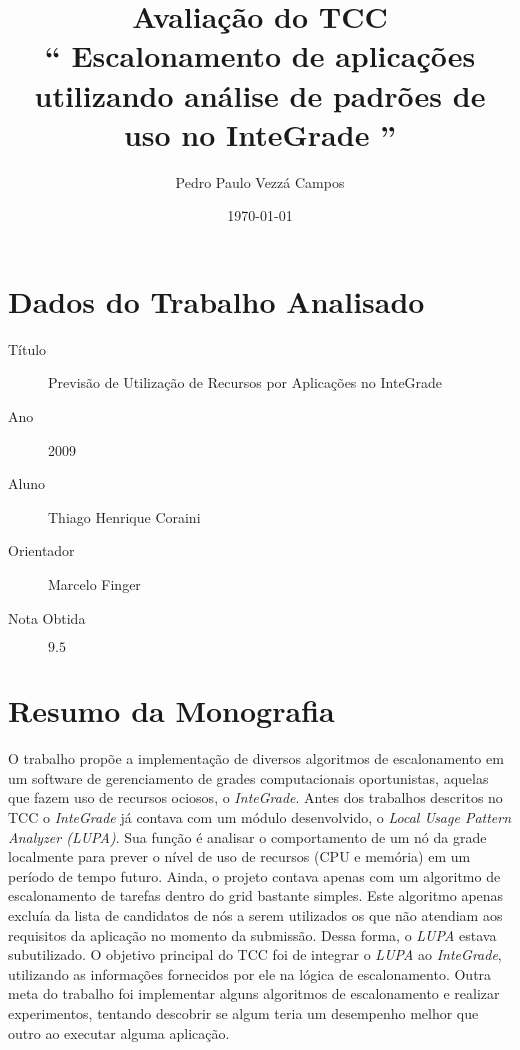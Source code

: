 \documentclass{article}
\begin{document}
\author{Pedro Paulo Vezzá Campos}
\title{Avaliação do TCC \\ `` Escalonamento de aplicações utilizando análise de padrões de uso no InteGrade ''}
\date{\today}
\maketitle

\section{Dados do Trabalho Analisado}
	\begin{description}
		\item[Título] Previsão de Utilização de Recursos por Aplicações no InteGrade
		\item[Ano] 2009
		\item[Aluno] Thiago Henrique Coraini 
		\item[Orientador] Marcelo Finger
		\item[Nota Obtida] $9.5$
	\end{description}

\section{Resumo da Monografia}
	O trabalho propõe a implementação de diversos algoritmos de escalonamento em um software de gerenciamento de grades computacionais oportunistas, aquelas que fazem uso de recursos ociosos, o \emph{InteGrade}. Antes dos trabalhos descritos no TCC o \emph{InteGrade} já contava com um módulo desenvolvido, o \emph{Local Usage Pattern Analyzer (LUPA)}. Sua função é analisar o comportamento de um nó da grade localmente para prever o nível de uso de recursos (CPU e memória) em um período de tempo futuro. Ainda, o projeto contava apenas com um algoritmo de escalonamento de tarefas dentro do grid bastante simples. Este algoritmo apenas excluía da lista de candidatos de nós a serem utilizados os que não atendiam aos requisitos da aplicação no momento da submissão. Dessa forma, o \emph{LUPA} estava subutilizado. O objetivo principal do TCC foi de integrar o \emph{LUPA} ao \emph{InteGrade}, utilizando as informações fornecidos por ele na lógica de escalonamento. Outra meta do trabalho foi implementar alguns algoritmos de escalonamento e realizar experimentos, tentando descobrir se algum teria um desempenho melhor que outro ao executar alguma aplicação.
	
\end{document}
